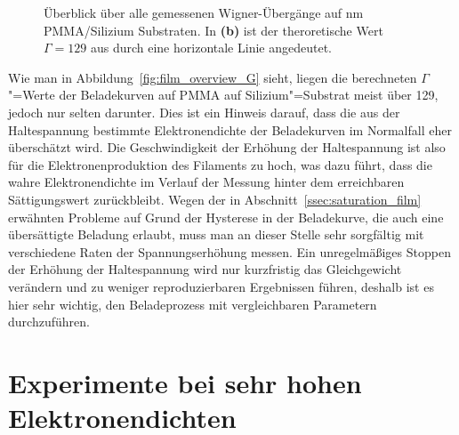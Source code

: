 \begin{figure}[h!tbp]
    \centerline{%
        \hfill%
        }
    \caption[Überblick über verwendete Messparameter auf PMMA]{Überblick über alle gemessenen Wigner-Übergänge auf \unit[200]{nm} PMMA/Silizium Substraten. In {\bfseries (b)} ist der theroretische Wert $\Gamma=129$ aus \cite{Mor79} durch eine horizontale Linie angedeutet.}
    \label{fig:film_overview}
\end{figure}

Wie man in Abbildung~\ref{fig:film_overview_G} sieht, liegen die berechneten $\Gamma$"=Werte der Beladekurven auf PMMA auf Silizium"=Substrat meist über 129, jedoch nur selten darunter. Dies ist ein Hinweis darauf, dass die aus der Haltespannung bestimmte Elektronendichte der Beladekurven im Normalfall eher überschätzt wird. Die Geschwindigkeit der Erhöhung der Haltespannung ist also für die Elektronenproduktion des Filaments zu hoch, was dazu führt, dass die wahre Elektronendichte im Verlauf der Messung hinter dem erreichbaren Sättigungswert zurückbleibt. Wegen der in Abschnitt~\ref{ssec:saturation_film} erwähnten Probleme auf Grund der Hysterese in der Beladekurve, die auch eine übersättigte Beladung erlaubt, muss man an dieser Stelle sehr sorgfältig mit verschiedene Raten der Spannungserhöhung messen. Ein unregelmäßiges Stoppen der Erhöhung der Haltespannung wird nur kurzfristig das Gleichgewicht verändern und zu weniger reproduzierbaren Ergebnissen führen, deshalb ist es hier sehr wichtig, den Beladeprozess mit vergleichbaren Parametern durchzuführen.

\section{Experimente bei sehr hohen Elektronendichten}
